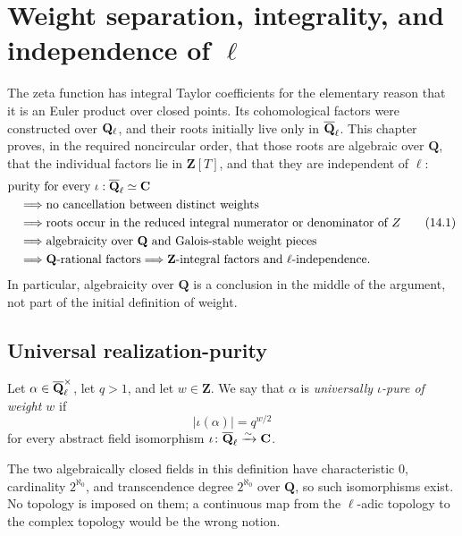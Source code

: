 \chapter{Weight separation, integrality, and independence of \texorpdfstring{\(\ell\)}{ell}}
\label{chap:integrality}

The zeta function has integral Taylor coefficients for the elementary
reason that it is an Euler product over closed points.  Its
cohomological factors were constructed over \(\mathbf Q_\ell\), and their roots
initially live only in \(\overline{\mathbf Q}_\ell\).  This chapter proves, in the required
noncircular order, that those roots are algebraic over \(\mathbf Q\), that
the individual factors lie in \(\mathbf Z[T]\), and that they are
independent of \(\ell\):
\[
\begin{split}
 &\text{purity for every }\iota:\overline{\mathbf Q}_\ell\simeq\mathbf C\\
 &\quad\Longrightarrow\text{no cancellation between distinct weights}\\
 &\quad\Longrightarrow\text{roots occur in the reduced integral
 numerator or denominator of }Z\\
 &\quad\Longrightarrow\text{algebraicity over }\mathbf Q
 \text{ and Galois-stable weight pieces}\\
 &\quad\Longrightarrow\mathbf Q\text{-rational factors}
 \Longrightarrow\mathbf Z\text{-integral factors and }\ell\text{-independence}.
\end{split}
\tag{14.1}\label{eq:arithmetic-order}
\]
In particular, algebraicity over \(\mathbf Q\) is a conclusion in the
middle of the argument, not part of the initial definition of weight.

\section{Universal realization-purity}

\begin{definition}
Let \(\alpha\in\overline{\mathbf Q}_\ell^\times\), let \(q>1\), and let \(w\in\mathbf Z\).
We say that \(\alpha\) is \emph{universally \(\iota\)-pure of weight
\(w\)} if
\[
  |\iota(\alpha)|=q^{w/2}
\]
for every abstract field isomorphism
\(\iota\colon\overline{\mathbf Q}_\ell\xrightarrow{\sim}\mathbf C\).
\end{definition}

The two algebraically closed fields in this definition have
characteristic \(0\), cardinality \(2^{\aleph_0}\), and transcendence
degree \(2^{\aleph_0}\) over \(\mathbf Q\), so such isomorphisms exist.
No topology is imposed on them; a continuous map from the \(\ell\)-adic
topology to the complex topology would be the wrong notion.

